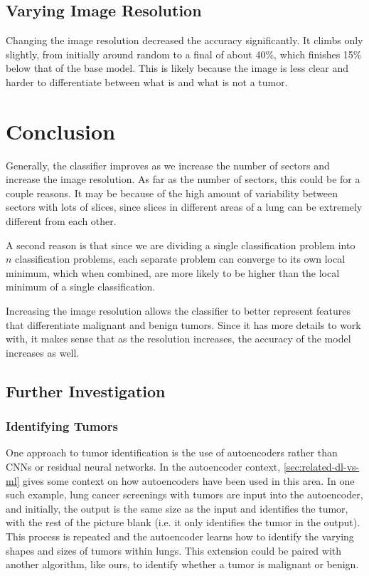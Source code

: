 \documentclass[10pt,twocolumn,letterpaper]{article}
\begin{document}
   \subsection{Varying Image Resolution} \label{sec:results-res}

		Changing the image resolution decreased the accuracy significantly. It climbs only slightly, from initially around random to a final of about 40\%, which finishes 15\% below that of the base model. This is likely because the image is less clear and harder to differentiate between what is and what is not a tumor. 

\section{Conclusion} \label{sec:conclusion}

	Generally, the classifier improves as we increase the number of sectors and increase the image resolution. As far as the number of sectors, this could be for a couple reasons. It may be because of the high amount of variability between sectors with lots of slices, since slices in different areas of a lung can be extremely different from each other. 

A second reason is that since we are dividing a single classification problem into $n$ classification problems, each separate problem can converge to its own local minimum, which when combined, are more likely to be higher than the local minimum of a single classification. 

Increasing the image resolution allows the classifier to better represent features that differentiate malignant and benign tumors. Since it has more details to work with, it makes sense that as the resolution increases, the accuracy of the model increases as well. 

   \subsection{Further Investigation} \label{sec:further}

      \subsubsection{Identifying Tumors} \label{sec:id-tumor}

         One approach to tumor identification is the use of autoencoders rather than CNNs or residual neural networks. In the autoencoder context, \ref{sec:related-dl-vs-ml} gives some context on how autoencoders have been used in this area. In one such example, lung cancer screenings with tumors are input into the autoencoder, and initially, the output is the same size as the input and identifies the tumor, with the rest of the picture blank (i.e. it only identifies the tumor in the output). This process is repeated and the autoencoder learns how to identify the varying shapes and sizes of tumors within lungs. This extension could be paired with another algorithm, like ours, to identify whether a tumor is malignant or benign.
\end{document}

